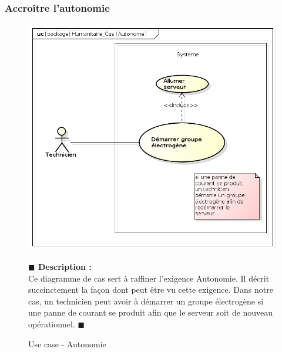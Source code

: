 \documentclass[11pt, titlepage]{report}
\newcommand{\debutDescription}{\noindent\textbf{\textcolor{DescriptionColor}{$\blacksquare$  Description : \\}}}
\newcommand{\finDescription}{\noindent\textcolor{DescriptionColor}{$\blacksquare$}}
\begin{document}
\subsubsection{Accroître l'autonomie}
\begin{figure}[h!]
\begin{center}
\includegraphics[scale=.4]{../images/diagrammes/sysml/use_case/autonome.png}
\end{center}
\caption{Use case - Autonomie}
\debutDescription
Ce diagramme de cas sert à raffiner l'exigence Autonomie. Il décrit succinctement la façon dont peut être vu cette exigence. Dans notre cas, un technicien peut avoir à démarrer un groupe électrogène si une panne de courant se produit afin que le serveur soit de nouveau opérationnel.
\finDescription
\end{figure}

\clearpage
\end{document}
